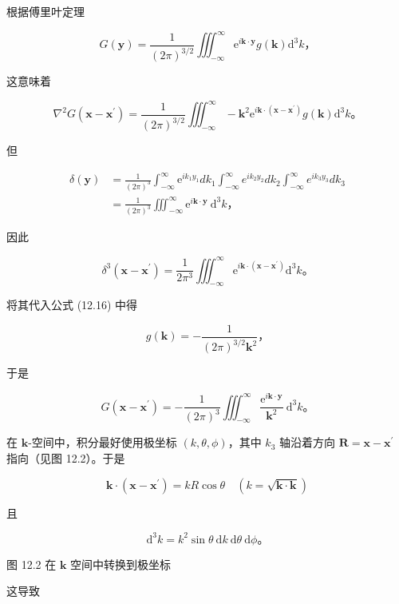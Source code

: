根据傅里叶定理

\[
G(\mathbf{y})=\frac{1}{(2 \pi)^{3 / 2}} \iiint_{-\infty}^{\infty} \mathrm{e}^{i \mathbf{k} \cdot \mathbf{y}} g(\mathbf{k}) \mathrm{d}^{3} k，
\]

这意味着

\[
\nabla^{2} G\left(\mathbf{x}-\mathbf{x}^{\prime}\right)=\frac{1}{(2 \pi)^{3 / 2}} \iiint_{-\infty}^{\infty}-\mathbf{k}^{2} \mathrm{e}^{i \mathbf{k} \cdot \left(\mathbf{x}-\mathbf{x}^{\prime}\right)} g(\mathbf{k}) \mathrm{d}^{3} k。
\]

但

\[
\begin{aligned}
\delta(\mathbf{y}) & =\frac{1}{(2 \pi)^{3}} \int_{-\infty}^{\infty} \mathrm{e}^{i k_{1} y_{1}} d k_{1} \int_{-\infty}^{\infty} e^{i k_{2} y_{2}} d k_{2} \int_{-\infty}^{\infty} e^{i k_{3} y_{3}} d k_{3} \\
& =\frac{1}{(2 \pi)^{3}} \iiint_{-\infty}^{\infty} \mathrm{e}^{i \mathbf{k} \cdot \mathbf{y}} \mathrm{~d}^{3} k，
\end{aligned}
\]

因此

\[
\delta^{3}\left(\mathbf{x}-\mathbf{x}^{\prime}\right)=\frac{1}{2 \pi^{3}} \iiint_{-\infty}^{\infty} \mathrm{e}^{i \mathbf{k} \cdot\left(\mathbf{x}-\mathbf{x}^{\prime}\right)} \mathrm{d}^{3} k。
\]

将其代入公式 (12.16) 中得

\[
g(\mathbf{k})=-\frac{1}{(2 \pi)^{3 / 2} \mathbf{k}^{2}}，
\]

于是

\[
G\left(\mathbf{x}-\mathbf{x}^{\prime}\right)=-\frac{1}{(2 \pi)^{3}} \iiint_{-\infty}^{\infty} \frac{\mathrm{e}^{i \mathbf{k} \cdot \mathbf{y}}}{\mathbf{k}^{2}} \mathrm{~d}^{3} k。
\]

在 \(\mathbf{k}\)-空间中，积分最好使用极坐标 \((k, \theta, \phi)\)，其中
\(k_{3}\) 轴沿着方向 \(\mathbf{R}=\mathbf{x}-\mathbf{x}^{\prime}\)
指向（见图 12.2）。于是

\[
\mathbf{k} \cdot\left(\mathbf{x}-\mathbf{x}^{\prime}\right)=k R \cos \theta \quad(k=\sqrt{\mathbf{k} \cdot \mathbf{k}})
\]

且

\[
\mathrm{d}^{3} k=k^{2} \sin \theta \mathrm{~d} k \mathrm{~d} \theta \mathrm{~d} \phi。
\]

图 12.2 在 \(\mathbf{k}\) 空间中转换到极坐标

这导致

